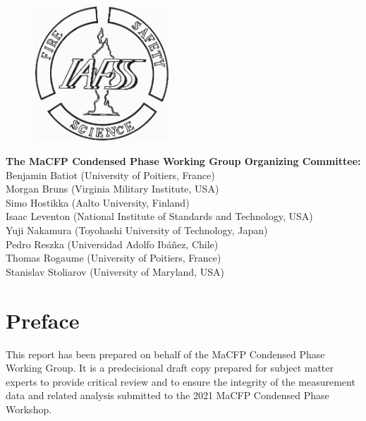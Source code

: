 \documentclass{book}
\begin{document}
\begin{minipage}{0.25\textwidth}
\begin{figure}[H]
\includegraphics[width=2in]{FIGURES/IAFSSLogo}
\end{figure}
\end{minipage} \hfill
\begin{minipage}{0.7\textwidth}
\begin{flushright}
{\bf The MaCFP Condensed Phase Working Group Organizing Committee:} \\
Benjamin Batiot (University of Poitiers, France) \\
Morgan Bruns (Virginia Military Institute, USA) \\
Simo Hostikka (Aalto University, Finland) \\
Isaac Leventon (National Institute of Standards and Technology, USA) \\
Yuji Nakamura (Toyohashi University of Technology, Japan) \\
Pedro Reszka (Universidad Adolfo Ibáñez, Chile) \\
Thomas Rogaume (University of Poitiers, France) \\
Stanislav Stoliarov (University of Maryland, USA)
\end{flushright}
\end{minipage}


\newpage
\thispagestyle{empty}

\frontmatter


\chapter{Preface}

This report has been prepared on behalf of the MaCFP Condensed Phase Working Group. It is a predecisional draft copy prepared for subject matter experts to provide critical review and to ensure the integrity of the measurement data and related analysis submitted to the 2021 MaCFP Condensed Phase Workshop.
\end{document}
